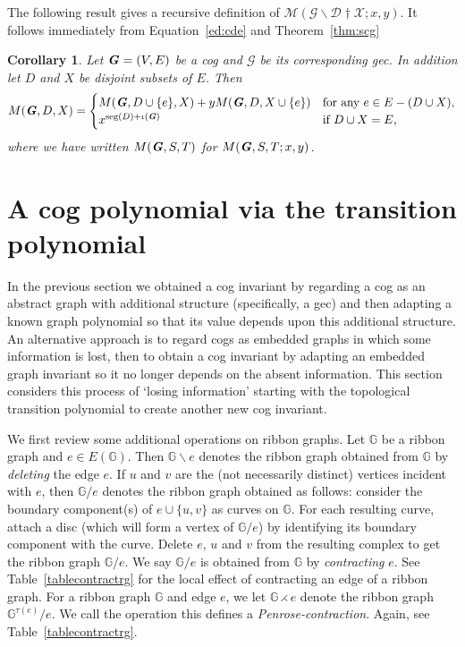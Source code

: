 \documentclass{amsart}
\newcommand{\bG}{\mathbb{G}}
\newcommand{\gec}[1]{\mathcal{#1}}
\newcommand{\calM}{\mathcal{M}}
\newcommand{\cog}[1]{\textbf{\textit #1}}
\newcommand{\ba}{\mathbin{\backslash}}
\newcommand{\ext}{\mathbin{\dagger}}
\DeclareMathOperator{\seg}{seg}
\newcommand{\tcon}{\mathbin{\rightthreetimes}}
\newtheorem{corollary}[theorem]{Corollary}
\theoremstyle{definition}
\theoremstyle{remark}
\numberwithin{equation}{section}
\begin{document}
The following result gives a recursive definition of $\calM(\gec{G}\ba \gec{D}\ext \gec{X};x,y) $. It follows immediately from Equation~\eqref{ed:cde} and Theorem~\ref{thm:scg}
\begin{corollary}
Let $\cog{G}=(V,E)$ be a cog and $\gec{G}$ be its corresponding gec. In addition let $D$ and $X$ be disjoint subsets of $E$. Then 
\[  M(\cog{G},D,X)  =
\begin{cases}
M(\cog{G},D\cup \{e\},X) +y M(\cog{G},D,X\cup \{e\})  &
\text{for any $e\in E-(D\cup X)$,}\\
x^{\seg(D)+\iota(\cog{G})} & \text{if $D\cup X = E$,}
\end{cases}
\]
where we have written  $M(\cog{G},S,T)$ for $M(\cog{G},S,T;x, y)$. 
\end{corollary}



\section{A cog polynomial via the transition polynomial} \label{sec:trans2}

In the previous section we obtained a cog invariant by regarding a cog as an abstract graph with additional structure (specifically, a gec) and then adapting a known graph polynomial so that its value depends upon this additional structure. An alternative approach is to regard cogs as embedded graphs in which some information is lost, then to obtain a cog invariant by adapting an embedded graph invariant so it no longer depends on the absent information. This section  considers this process of `losing information' starting with the topological transition polynomial to create another new cog invariant.


We first  review some additional operations on ribbon graphs.
Let $\bG$ be a ribbon graph and $e\in E(\bG)$. Then $\bG\ba e$ denotes the ribbon graph obtained from $\bG$ by \emph{deleting} the edge $e$.
If $u$ and $v$ are the (not necessarily distinct) vertices incident with $e$, then $\bG/ e$ denotes the ribbon graph obtained as follows: consider the boundary component(s) of $e\cup\{u,v\}$ as curves on $\bG$. For each resulting curve, attach a disc (which will form a vertex of $\bG/e$) by identifying its boundary component with the curve. Delete $e$, $u$ and $v$ from the resulting complex to get the ribbon graph $\bG/e$. We say $\bG/e$ is obtained from $\bG$ by {\em contracting} $e$. See Table~\ref{tablecontractrg} for the local effect of contracting an edge of a ribbon graph.
For a ribbon graph $\bG$ and edge $e$, we let  $\bG\tcon e$ denote the ribbon graph $\bG^{\tau(e)}/e$.  We call the operation this defines a \emph{Penrose-contraction}. Again, see Table~\ref{tablecontractrg}.
\end{document}
